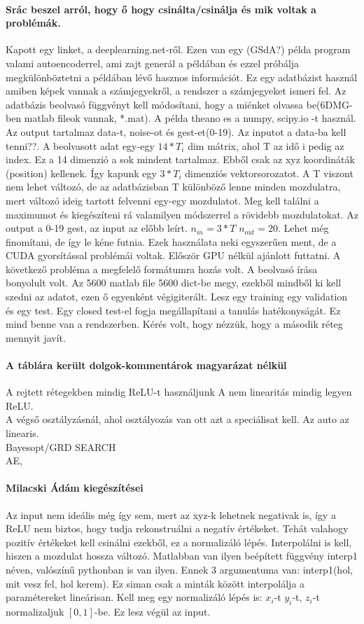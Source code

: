 \documentclass[10pt,a4paper]{report}
\begin{document}
\paragraph{Srác beszel arról, hogy ő hogy csinálta/csinálja és mik voltak a problémák.}
Kapott egy linket, a deeplearning.net-ről. Ezen van egy (GSdA?) példa program valami autoencoderrel, ami zajt generál a példában és ezzel próbálja megkülönböztetni a példában lévő hasznos információt. Ez egy adatbázist használ amiben képek vannak a számjegyekről, a rendszer a számjegyeket ismeri fel. Az adatbázis beolvasó függvényt kell módosítani, hogy a miénket olvassa be(6DMG-ben matlab fileok vannak, *.mat). A példa theano es a numpy, scipy.io -t használ. Az output tartalmaz data-t, noise-ot és gest-et(0-19). Az inputot a data-ba kell tenni??. A beolvasott adat egy-egy $14*T_i$ dim mátrix, ahol T az idő i pedig az index. Ez a 14 dimenzió a sok mindent tartalmaz. Ebből csak az xyz koordináták (position) kellenek. Így kapunk egy $3*T_i$ dimenziós vektorsorozatot. A T viszont nem lehet változó, de az adatbázisban T különböző lenne minden mozdulatra, mert változó ideig tartott felvenni egy-egy mozdulatot. Meg kell találni a maximumot és kiegészíteni rá valamilyen módszerrel a rövidebb mozdulatokat. Az output a 0-19 gest, az input az előbb leírt. $n_{in}=3*T$ $n_{out}=20$. Lehet még finomítani, de így le kéne futnia. Ezek használata neki egyszerűen ment, de a CUDA gyorsítással problémái voltak. Először GPU nélkül ajánlott futtatni. A következő probléma a megfelelő formátumra hozás volt. A beolvasó írása bonyolult volt. Az 5600 matlab file 5600 dict-be megy, ezekből mindből ki kell szedni az adatot, ezen ő egyenként végigiterált.
Lesz egy training egy validation és egy test. Egy closed test-el fogja megállapítani a tanulás hatékonyságát. Ez mind benne van a rendszerben.
Kérés volt, hogy nézzük, hogy a második réteg mennyit javít.
\paragraph{A táblára került dolgok-kommentárok magyarázat nélkül}
A rejtett rétegekben mindig ReLU-t használjunk A nem linearitás mindig legyen ReLU. \\
A végső osztályzásnál, ahol osztályozás van ott azt a speciálisat kell. Az auto az linearis.\\
Bayesopt/GRD SEARCH\\
AE, \\
\paragraph{Milacski Ádám kiegészítései}
Az input nem ideális még így sem, mert az xyz-k lehetnek negativak is, így a ReLU nem biztos, hogy tudja rekonstruálni a negatív értékeket. Tehát valahogy pozitív értékeket kell csinálni ezekből, ez a normalizáló lépés. Interpolálni is kell, hiszen a mozdulat hossza változó. Matlabban van ilyen beépített függvény interp1 néven, valószínű pythonban is van ilyen. Ennek 3 argumentuma van: interp1(hol, mit vesz fel, hol kerem). Ez siman csak a minták között interpolálja a paramétereket lineárisan. Kell meg egy normalizáló lépés is: $x_i$-t $y_i$-t, $z_i$-t normalizaljuk $[0,1]$-be. Ez lesz végül az input. 
\end{document}
